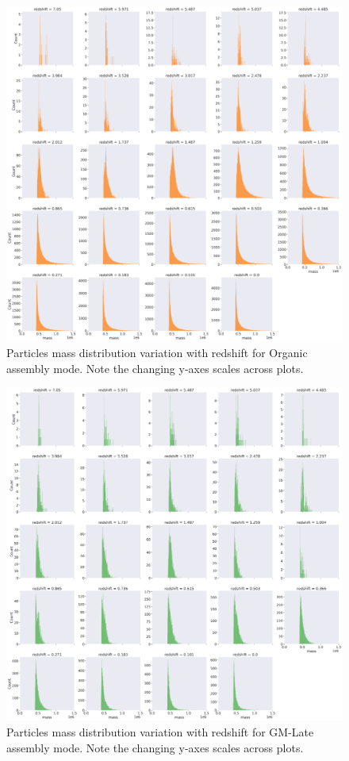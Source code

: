\documentclass{article}
\begin{document}
	\begin{figure}
			\centering 
			\includegraphics[width=.9\columnwidth]{../../plots/mass_plotter/mass_distribution_wrt_redshift_Organic.png}
			\caption{Particles mass distribution variation with redshift for Organic assembly mode. Note the changing y-axes scales across plots.}
	\end{figure}

	\clearpage

	\begin{figure}
			\centering 
			\includegraphics[width=.9\columnwidth]{../../plots/mass_plotter/mass_distribution_wrt_redshift_GM-Late.png}
			\caption{Particles mass distribution variation with redshift for GM-Late assembly mode. Note the changing y-axes scales across plots.}
	\end{figure}
\end{document}

